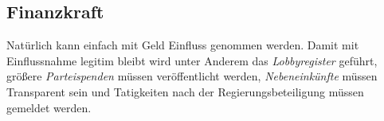 \documentclass{article}
\begin{document}
\subsection{Finanzkraft} 
Natürlich kann einfach mit Geld Einfluss genommen werden. Damit mit Einflussnahme legitim bleibt wird unter Anderem das \emph{Lobbyregister} geführt, größere \emph{Parteispenden} müssen veröffentlicht werden, \emph{Nebeneinkünfte} müssen Transparent sein und Tatigkeiten nach der Regierungsbeteiligung müssen gemeldet werden.   
\end{document}
